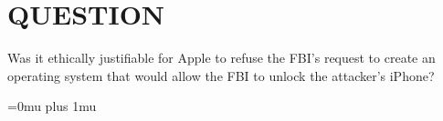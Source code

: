 \documentclass[12pt]{article}
\begin{document}


\thispagestyle{empty}
\pagestyle{plain}
\newpage
    \onecolumn
	\tableofcontents
\newpage

\setcounter{page}{1}
\twocolumn


\section{QUESTION}
Was it ethically justifiable for Apple to refuse the FBI's request to create an operating system that would allow the FBI to unlock the attacker's iPhone?
\vspace{0.4cm}










\newpage
\onecolumn
\Urlmuskip=0mu plus 1mu\relax
{}	




\newpage
\end{document}

